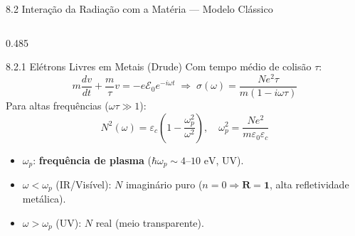 \documentclass[aspectratio=169, 9pt]{beamer}
\begin{document}
\begin{frame}[shrink=2]{8.2 Interação da Radiação com a Matéria --- Modelo Clássico}
  \begin{columns}[T, onlytextwidth]
    \begin{column}{0.485\textwidth}
      \begin{block}{8.2.1 Elétrons Livres em Metais (Drude)}
        Com tempo médio de colisão $\tau$:
        \[
          m\frac{dv}{dt} + \frac{m}{\tau}v = -e\mathcal{E}_0 e^{-i\omega t} \;\Rightarrow\; \sigma(\omega) = \frac{Ne^2\tau}{m(1 - i\omega\tau)}
        \]
        Para altas frequências ($\omega\tau \gg 1$):
        \[
          N^2(\omega) = \varepsilon_c\left(1 - \frac{\omega_p^2}{\omega^2}\right), \quad \omega_p^2 = \frac{Ne^2}{m\varepsilon_0\varepsilon_c}
        \]
        \begin{itemize}
          \item $\omega_p$: \textbf{frequência de plasma} ($\hbar\omega_p \sim 4\text{--}10\text{ eV}$, UV).
          \item $\omega < \omega_p$ (IR/Visível): $N$ imaginário puro ($n = 0 \Rightarrow \mathbf{R = 1}$, alta refletividade metálica).
          \item $\omega > \omega_p$ (UV): $N$ real (meio transparente).
        \end{itemize}
      \end{block}
    \end{column}


\end{columns}
\end{frame}
\end{document}
